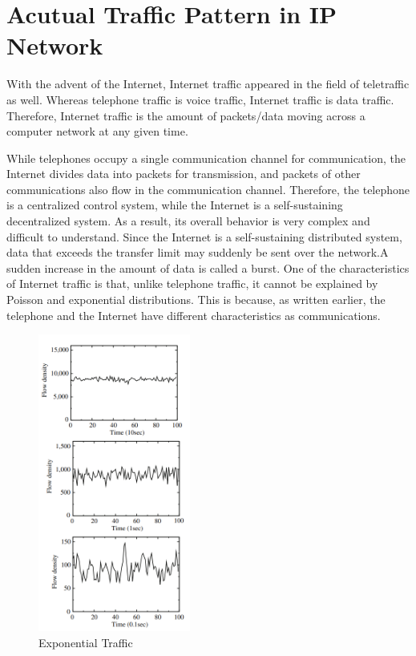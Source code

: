 \section{Acutual Traffic Pattern in IP Network}
With the advent of the Internet, Internet traffic appeared in the field of teletraffic as well.
Whereas telephone traffic is voice traffic, Internet traffic is data traffic.
Therefore, Internet traffic is the amount of packets/data moving across a computer network at any given time.

While telephones occupy a single communication channel for communication, the Internet divides data into packets for transmission, and packets of other communications also flow in the communication channel.
Therefore, the telephone is a centralized control system, while the Internet is a self-sustaining decentralized system. 
As a result, its overall behavior is very complex and difficult to understand.
Since the Internet is a self-sustaining distributed system, data that exceeds the transfer limit may suddenly be sent over the network.A sudden increase in the amount of data is called a burst.
One of the characteristics of Internet traffic is that, unlike telephone traffic, it cannot be explained by Poisson and exponential distributions.\cite{Fukuda2004}
This is because, as written earlier, the telephone and the Internet have different characteristics as communications.
  \begin{figure}[ht]
    \centering
    \includegraphics[width=5cm]{img/exponential.png}
    \caption{Exponential Traffic \protect \footnotemark}
    \label{fig:exponential}  
  \end{figure}

